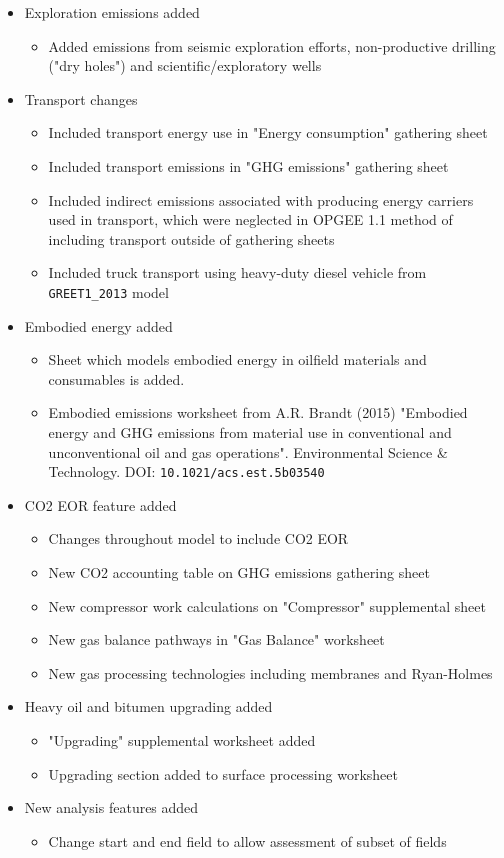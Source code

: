 \documentclass[11pt]{report}
\begin{document}
{{{{\begin{itemize}
\item Exploration emissions added	
	\begin{itemize}		
	\item Added emissions from seismic exploration efforts, non-productive drilling ("dry holes") and scientific/exploratory wells		
	\end{itemize}
\item Transport changes	
	\begin{itemize}			
	\item Included transport energy use in "Energy consumption" gathering sheet		
	\item Included transport emissions in "GHG emissions" gathering sheet		
	\item Included indirect emissions associated with producing energy carriers used in transport, which were neglected in OPGEE 1.1 method of including transport outside of gathering sheets		
	\item Included truck transport using heavy-duty diesel vehicle from \verb+GREET1_2013+ model		
	\end{itemize}	
\item Embodied energy added	
	\begin{itemize}			
	\item Sheet which models embodied energy in oilfield materials and consumables is added.		
	\item Embodied emissions worksheet from A.R. Brandt (2015) "Embodied energy and GHG emissions from material use in conventional and unconventional oil and gas operations". Environmental Science \& Technology. DOI: \verb+10.1021/acs.est.5b03540+		
	\end{itemize}	
\item CO2 EOR feature added	
	\begin{itemize}			
	\item Changes throughout model to include CO2 EOR		
	\item New CO2 accounting table on GHG emissions gathering sheet		
	\item New compressor work calculations on "Compressor" supplemental sheet		
	\item New gas balance pathways in "Gas Balance" worksheet		
	\item New gas processing technologies including membranes and Ryan-Holmes		
	\end{itemize}	
\item Heavy oil and bitumen upgrading added	
	\begin{itemize}			
	\item "Upgrading" supplemental worksheet added		
	\item Upgrading section added to surface processing worksheet		
	\end{itemize}	
\item New analysis features added	
	\begin{itemize}			
	\item Change start and end field to allow assessment of subset of fields		
	\end{itemize}
	

\end{itemize}}}}}
\end{document}
